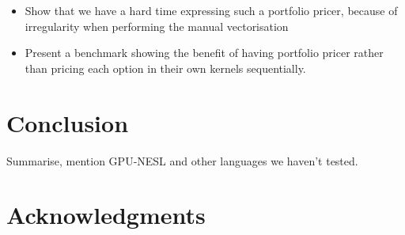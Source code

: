 \documentclass{llncs2e/llncs}
\begin{document}
\begin{itemize}
\item Show that we have a hard time expressing such a portfolio
  pricer, because of irregularity when performing the manual
  vectorisation
\item Present a benchmark showing the benefit of having portfolio
  pricer rather than pricing each option in their own kernels
  sequentially.
\end{itemize}



\section{Conclusion}
Summarise, mention GPU-NESL and other languages we haven't tested.

\section{Acknowledgments}

 

\end{document}
